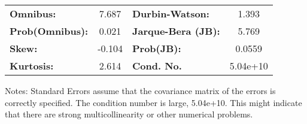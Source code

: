\begin{center}
\begin{tabular}{lcccccc}
\bottomrule
\end{tabular}
\begin{tabular}{lclc}
\textbf{Omnibus:}       &  7.687 & \textbf{  Durbin-Watson:     } &    1.393  \\
\textbf{Prob(Omnibus):} &  0.021 & \textbf{  Jarque-Bera (JB):  } &    5.769  \\
\textbf{Skew:}          & -0.104 & \textbf{  Prob(JB):          } &   0.0559  \\
\textbf{Kurtosis:}      &  2.614 & \textbf{  Cond. No.          } & 5.04e+10  \\
\bottomrule
\end{tabular}
\end{center}

Notes: \newline
 [1] Standard Errors assume that the covariance matrix of the errors is correctly specified. \newline
 [2] The condition number is large, 5.04e+10. This might indicate that there are \newline
 strong multicollinearity or other numerical problems.